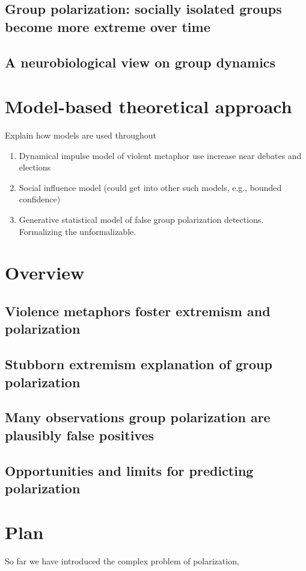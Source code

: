 \documentclass[12pt,letterpaper]{article}
\begin{document}
\subsection{Group polarization: socially isolated groups become more extreme over time}


\subsection{A neurobiological view on group dynamics}


\section{Model-based theoretical approach}

Explain how models are used throughout
\begin{enumerate}
  \item 
    Dynamical impulse model of violent metaphor use 
    increase near debates and elections
  \item
    Social influence model (could get into other such models, e.g., bounded confidence)
  \item
    Generative statistical model of false group polarization detections.
    Formalizing the unformalizable.
\end{enumerate}

\section{Overview}

\subsection{Violence metaphors foster extremism and polarization}

\subsection{Stubborn extremism explanation of group polarization}

\subsection{Many observations group polarization are plausibly false positives}

\subsection{Opportunities and limits for predicting polarization}

\section{Plan}

So far we have introduced the complex problem of polarization, 



\setlength{\bibleftmargin}{.125in}
\setlength{\bibindent}{-\bibleftmargin}


\end{document}
